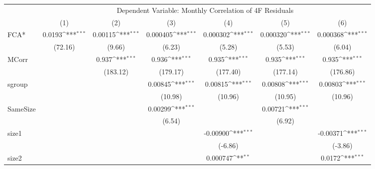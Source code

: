 {
\def\sym#1{\ifmmode^{#1}\else\(^{#1}\)\fi}
\begin{tabular}{l*{6}{c}}
\hline\hline
 & \multicolumn{6}{c}{Dependent Variable: Monthly Correlation of 4F Residuals}                 \\
 \cline{2-7}
                    &\multicolumn{1}{c}{(1)}         &\multicolumn{1}{c}{(2)}         &\multicolumn{1}{c}{(3)}         &\multicolumn{1}{c}{(4)}         &\multicolumn{1}{c}{(5)}         &\multicolumn{1}{c}{(6)}         \\
\hline
FCA*                &      0.0193\sym{***}&     0.00115\sym{***}&    0.000405\sym{***}&    0.000302\sym{***}&    0.000320\sym{***}&    0.000368\sym{***}\\
                    &     (72.16)         &      (9.66)         &      (6.23)         &      (5.28)         &      (5.53)         &      (6.04)         \\
[1em]
MCorr               &                     &       0.937\sym{***}&       0.936\sym{***}&       0.935\sym{***}&       0.935\sym{***}&       0.935\sym{***}\\
                    &                     &    (183.12)         &    (179.17)         &    (177.40)         &    (177.14)         &    (176.86)         \\
[1em]
sgroup              &                     &                     &     0.00845\sym{***}&     0.00815\sym{***}&     0.00808\sym{***}&     0.00803\sym{***}\\
                    &                     &                     &     (10.98)         &     (10.96)         &     (10.95)         &     (10.96)         \\
[1em]
SameSize            &                     &                     &     0.00299\sym{***}&                     &     0.00721\sym{***}&                     \\
                    &                     &                     &      (6.54)         &                     &      (6.92)         &                     \\
[1em]
size1               &                     &                     &                     &    -0.00900\sym{***}&                     &    -0.00371\sym{***}\\
                    &                     &                     &                     &     (-6.86)         &                     &     (-3.86)         \\
[1em]
size2               &                     &                     &                     &    0.000747\sym{**} &                     &      0.0172\sym{***}\\

\end{tabular}}
